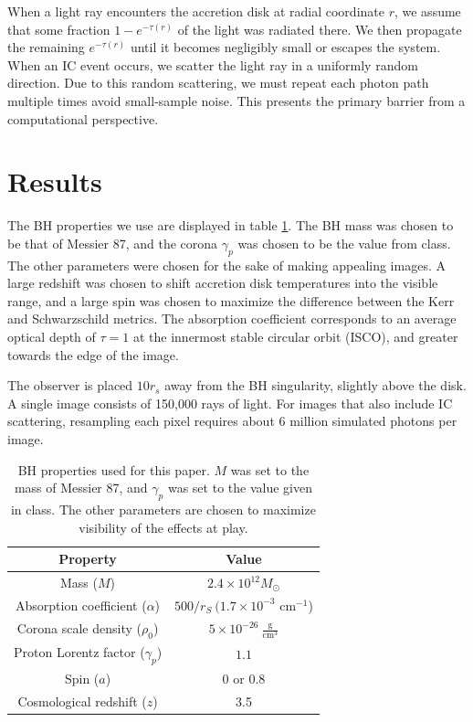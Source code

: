 \documentclass[twocolumn,twocolappendix]{aastex631}
\begin{document}
When a light ray encounters the accretion disk at radial coordinate $r$, we assume that some fraction $1-e^{-\tau(r)}$ of the light was radiated there. We then propagate the remaining $e^{-\tau(r)}$ until it becomes negligibly small or escapes the system. When an IC event occurs, we scatter the light ray in a uniformly random direction. Due to this random scattering, we must repeat each photon path multiple times avoid small-sample noise. This presents the primary barrier from a computational perspective.


\section{Results}
\label{sec:results}
The BH properties we use are displayed in table \ref{tab:props}. The BH mass was chosen to be that of Messier 87, and the corona $\gamma_p$ was chosen to be the value from class. The other parameters were chosen for the sake of making appealing images. A large redshift was chosen to shift accretion disk temperatures into the visible range, and a large spin was chosen to maximize the difference between the Kerr and Schwarzschild metrics. The absorption coefficient corresponds to an average optical depth of $\tau = 1$ at the innermost stable circular orbit (ISCO), and greater towards the edge of the image.

The observer is placed $10r_s$ away from the BH singularity, slightly above the disk. A single image consists of 150,000 rays of light. For images that also include IC scattering, resampling each pixel requires about 6 million simulated photons per image.

\begin{table}[htbp!]
  \centering
  \begin{tabular}{cc}
    \hline \hline 
    Property  & Value \\ \hline
    Mass ($M$) & $2.4 \times 10^{12} M_\odot$ \\ 
    Absorption coefficient ($\alpha$) & $500/r_S\ (1.7\times 10^{-3}$ cm$^{-1}$) \\ 
    Corona scale density ($\rho_0$) & $5 \times 10^{-26}\ \frac{\text{g}}{\text{cm}^3}$ \\ 
    Proton Lorentz factor ($\gamma_p$) & $1.1$ \\ 
    Spin ($a$) & 0 or 0.8 \\ 
    Cosmological redshift ($z$) & 3.5 \\ 
    \hline \hline
  \end{tabular}
  \caption{BH properties used for this paper. $M$ was set to the mass of Messier 87, and $\gamma_p$ was set to the value given in class. The other parameters are chosen to maximize visibility of the effects at play.}
  \label{tab:props}
\end{table}
\end{document}
